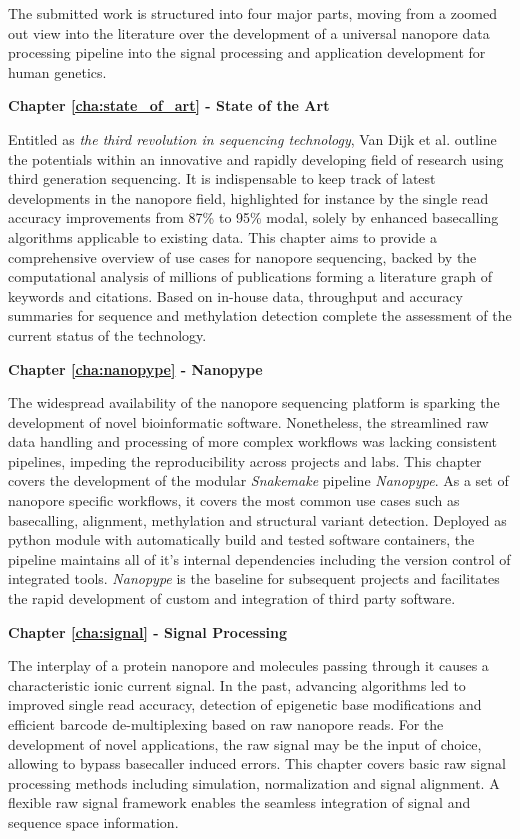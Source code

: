 The submitted work is structured into four major parts, moving from a zoomed out view into the literature over the development of a universal nanopore data processing pipeline into the signal processing and application development for human genetics.

\textbf{Chapter \ref{cha:state_of_art} - State of the Art} %

Entitled as \textit{the third revolution in sequencing technology}, Van Dijk et al. \cite{Dijk2018} outline the potentials within an innovative and rapidly developing field of research using third generation sequencing.
It is indispensable to keep track of latest developments in the nanopore field, highlighted for instance by the single read accuracy improvements from 87\% to 95\% modal, solely by enhanced basecalling algorithms applicable to existing data.
This chapter aims to provide a comprehensive overview of use cases for nanopore sequencing, backed by the computational analysis of millions of publications forming a literature graph of keywords and citations.
Based on in-house data, throughput and accuracy summaries for sequence and methylation detection complete the assessment of the current status of the technology.


\textbf{Chapter \ref{cha:nanopype} - Nanopype}

The widespread availability of the nanopore sequencing platform is sparking the development of novel bioinformatic software.
Nonetheless, the streamlined raw data handling and processing of more complex workflows was lacking consistent pipelines, impeding the reproducibility across projects and labs.
This chapter covers the development of the modular \textit{Snakemake} pipeline \textit{Nanopype}.
As a set of nanopore specific workflows, it covers the most common use cases such as basecalling, alignment, methylation and structural variant detection.
Deployed as python module with automatically build and tested software containers, the pipeline maintains all of it's internal dependencies including the version control of integrated tools.
\textit{Nanopype} is the baseline for subsequent projects and facilitates the rapid development of custom and integration of third party software.


\textbf{Chapter \ref{cha:signal} - Signal Processing}

The interplay of a protein nanopore and molecules passing through it causes a characteristic ionic current signal.
In the past, advancing algorithms led to improved single read accuracy, detection of epigenetic base modifications and efficient barcode de-multiplexing based on raw nanopore reads.
For the development of novel applications, the raw signal may be the input of choice, allowing to bypass basecaller induced errors.
This chapter covers basic raw signal processing methods including simulation, normalization and signal alignment.
A flexible raw signal framework enables the seamless integration of signal and sequence space information.
 

